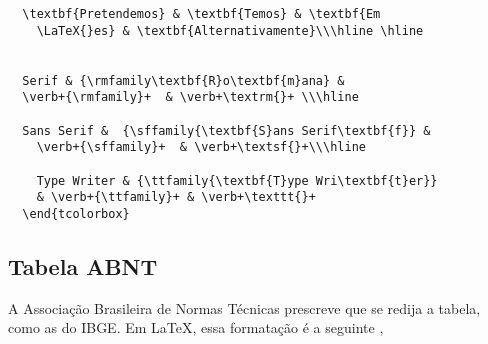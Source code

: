\documentclass[12pt,
brazilian,
a5paper]{abntex2} %
\begin{document}
{\begin{verbatim}
  \textbf{Pretendemos} & \textbf{Temos} & \textbf{Em
    \LaTeX{}es} & \textbf{Alternativamente}\\\hline \hline


  Serif & {\rmfamily\textbf{R}o\textbf{m}ana} &
  \verb+{\rmfamily}+  & \verb+\textrm{}+ \\\hline

  Sans Serif &  {\sffamily{\textbf{S}ans Serif\textbf{f}} &
    \verb+{\sffamily}+  & \verb+\textsf{}+\\\hline

    Type Writer & {\ttfamily{\textbf{T}ype Wri\textbf{t}er}}
    & \verb+{\ttfamily}+ & \verb+\texttt{}+
  \end{tcolorbox}

\end{verbatim}

                           \subsection{Tabela ABNT}

                           A Associação Brasileira de Normas Técnicas
                           prescreve que se redija a tabela, como as
                           do IBGE. Em \LaTeX{}, essa formatação é a
                           seguinte \cite{ibge1993},

                           \begin{table}[htb]



\end{table}}
\end{document}
